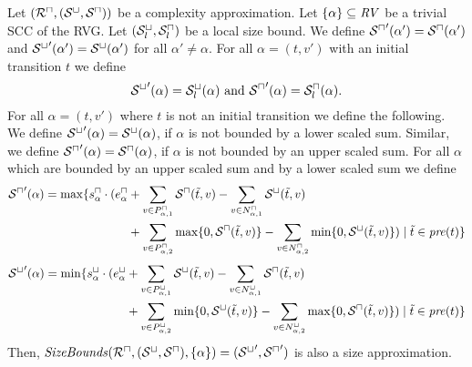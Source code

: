 \begin{theorem}
  Let $({\mathcal{R}^\sqcap}, {({\mathcal{S}^\sqcup}, {\mathcal{S}^\sqcap})})$ be a complexity approximation.
  Let $\lbrace \alpha \rbrace \subseteq \mathit{RV}$ be a trivial SCC of the RVG.
  Let ${({\mathcal{S}^\sqcup_l}, {\mathcal{S}^\sqcap_l})}$ be a local size bound.
  We define ${\mathcal{S}^\sqcap}'(\alpha') = {\mathcal{S}^\sqcap}(\alpha')$ and ${\mathcal{S}^\sqcup}'(\alpha') = {\mathcal{S}^\sqcup}(\alpha')$ for all $\alpha' \neq \alpha$.
  For all $\alpha = (t, v')$ with an initial transition $t$ we define
  \[ {\mathcal{S}^\sqcup}'(\alpha) = {\mathcal{S}^\sqcup_l}(\alpha) \text{ and } {\mathcal{S}^\sqcap}'(\alpha) = {\mathcal{S}^\sqcap_l}(\alpha). \]
  For all $\alpha = (t, v')$ where $t$ is not an initial transition we define the following.
  We define ${\mathcal{S}^\sqcup}'(\alpha) = {\mathcal{S}^\sqcup}(\alpha)$, if $\alpha$ is not bounded by a lower scaled sum.
  Similar, we define ${\mathcal{S}^\sqcap}'(\alpha) = {\mathcal{S}^\sqcap}(\alpha)$, if $\alpha$ is not bounded by an upper scaled sum.
  For all $\alpha$ which are bounded by an upper scaled sum and by a lower scaled sum we define 
  \begin{equation}
    \begin{split}
      {\mathcal{S}^\sqcap}'(\alpha) = \max \lbrace  s^\sqcap_\alpha \cdot ( e^\sqcap_\alpha & + \sum_{v \in P_{\alpha,1}^\sqcap} {\mathcal{S}^\sqcap}(\tilde{t}, v) - \sum_{v \in N_{\alpha,1}^\sqcap} {\mathcal{S}^\sqcup}(\tilde{t}, v) \\
        & + \sum_{v \in P_{\alpha,2}^\sqcap} \max \lbrace 0,{\mathcal{S}^\sqcap}(\tilde{t}, v) \rbrace - \sum_{v \in N_{\alpha,2}^\sqcap} \min \lbrace 0,{\mathcal{S}^\sqcup}(\tilde{t}, v) \rbrace ) \mid \tilde{t} \in \mathit{pre}(t) \rbrace
    \end{split}
  \end{equation}
  \begin{equation}
    \begin{split}
      {\mathcal{S}^\sqcup}'(\alpha) = \min \lbrace  s^\sqcup_\alpha \cdot ( e^\sqcup_\alpha & + \sum_{v \in P_{\alpha,1}^\sqcup} {\mathcal{S}^\sqcup}(\tilde{t}, v) - \sum_{v \in N_{\alpha,1}^\sqcup} {\mathcal{S}^\sqcap}(\tilde{t}, v) \\
        & + \sum_{v \in P_{\alpha,2}^\sqcup} \min \lbrace 0,{\mathcal{S}^\sqcup}(\tilde{t}, v) \rbrace - \sum_{v \in N_{\alpha,2}^\sqcup} \max \lbrace 0,{\mathcal{S}^\sqcap}(\tilde{t}, v) \rbrace ) \mid \tilde{t} \in \mathit{pre}(t) \rbrace
    \end{split}
  \end{equation}
  Then, $\mathit{SizeBounds}({\mathcal{R}^\sqcap}, {({\mathcal{S}^\sqcup}, {\mathcal{S}^\sqcap})}, \lbrace \alpha \rbrace) = ({\mathcal{S}^\sqcup}', {\mathcal{S}^\sqcap}')$ is also a size approximation.
\end{theorem}
